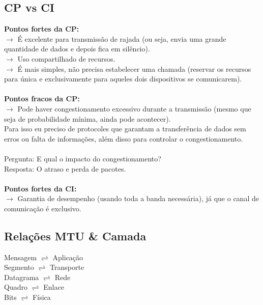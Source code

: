 \documentclass[12pt]{article}
\begin{document}
    \subsection{CP vs CI}
    \textbf{Pontos fortes da CP:}
    \\$\rightarrow$ É excelente para transmissão de rajada (ou seja, envia uma grande quantidade de dados e depois fica em silêncio).
    \\$\rightarrow$ Uso compartilhado de recursos.
    \\$\rightarrow$ É mais simples, não precisa estabelecer uma chamada (reservar os recursos para única e exclusivamente para aqueles dois dispositivos se comunicarem).
    \\~\\\textbf{Pontos fracos da CP:}
    \\$\rightarrow$ Pode haver congestionamento excessivo durante a transmissão (mesmo que seja de probabilidade mínima, ainda pode acontecer). 
    \\Para isso eu preciso de protocoles que garantam a transferência de dados sem erros ou falta de informações, além disso para controlar o congestionamento.
    \\~\\Pergunta: E qual o impacto do congestionamento? 
    \\Resposta: O atraso e perda de pacotes.
    \\~\\\textbf{Pontos fortes da CI:}
    \\$\rightarrow$ Garantia de desempenho (usando toda a banda necessária), já que o canal de comunicação é exclusivo.

    \subsection{Relações MTU \& Camada}
    Mensagem $\rightleftharpoons$ Aplicação
    \\Segmento $\rightleftharpoons$ Transporte
    \\Datagrama $\rightleftharpoons$ Rede
    \\Quadro $\rightleftharpoons$ Enlace
    \\Bits $\rightleftharpoons$ Física
    

\end{document}
